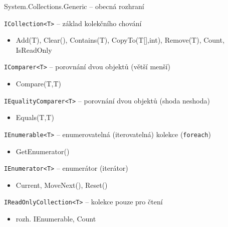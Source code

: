 \begin{frame}[fragile]
\begin{bitemize}{System.Collections.Generic -- obecná rozhraní}
\item \lstinline|ICollection<T>| -- základ kolekčního chování
\begin{itemize}
\item \footnotesize Add(T), Clear(), Contains(T), CopyTo(T[],int), Remove(T), Count, IsReadOnly
\end{itemize}

\item \lstinline|IComparer<T>| -- porovnání dvou objektů (větší menší)
\begin{itemize}
\item \footnotesize Compare(T,T)
\end{itemize}

\item \lstinline|IEqualityComparer<T>| -- porovnání dvou objektů (shoda neshoda)
\begin{itemize}
\item \footnotesize Equals(T,T)
\end{itemize}

\item \lstinline|IEnumerable<T>| -- enumerovatelná (iterovatelná) kolekce (\lstinline|foreach|)
\begin{itemize}
\item \footnotesize GetEnumerator()
\end{itemize}

\item \lstinline|IEnumerator<T>| -- enumerátor (iterátor)
\begin{itemize}
\item \footnotesize Current, MoveNext(), Reset()
\end{itemize}

\item \lstinline|IReadOnlyCollection<T>| -- kolekce pouze pro čtení
\begin{itemize}
\item \footnotesize rozh. IEnumerable, Count
\end{itemize}

\end{bitemize}
\end{frame}



